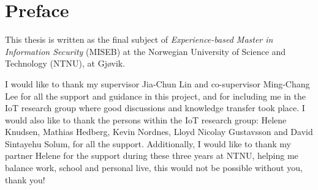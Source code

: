 \chapter*{Preface}

This thesis is written as the final subject of \textit{Experience-based Master in Information Security} (MISEB) at the Norwegian University of Science and Technology (NTNU), at Gjøvik. 

I would like to thank my supervisor Jia-Chun Lin and co-supervisor Ming-Chang Lee for all the support and guidance in this project, and for including me in the IoT research group where good discussions and knowledge transfer took place. I would also like to thank the persons within the IoT research group: Helene Knudsen, Mathias Hedberg, Kevin Nordnes, Lloyd Nicolay Gustavsson and David Sintayehu Solum, for all the support. Additionally, I would like to thank my partner Helene for the support during these three years at NTNU, helping me balance work, school and personal live, this would not be possible without you, thank you! 


